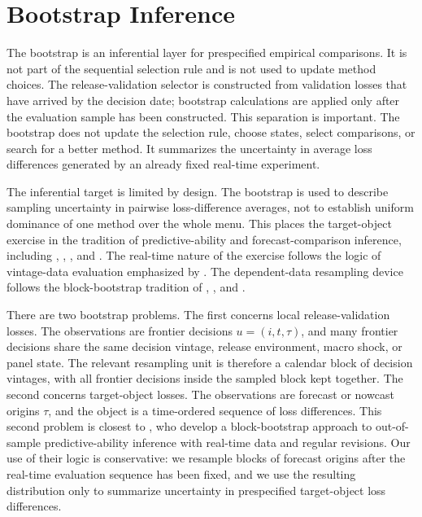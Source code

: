 \documentclass[a4paper,12pt]{article}
\newcommand{\1}{\mathbf{1}}
\begin{document}
\section{Bootstrap Inference}
\label{ia:bootstrap}

The bootstrap is an inferential layer for prespecified empirical comparisons. It is not part of the sequential selection rule and is not used to update method choices. The release-validation selector is constructed from validation losses that have arrived by the decision date; bootstrap calculations are applied only after the evaluation sample has been constructed. This separation is important. The bootstrap does not update the selection rule, choose states, select comparisons, or search for a better method. It summarizes the uncertainty in average loss differences generated by an already fixed real-time experiment.

The inferential target is limited by design. The bootstrap is used to describe sampling uncertainty in pairwise loss-difference averages, not to establish uniform dominance of one method over the whole menu. This places the target-object exercise in the tradition of predictive-ability and forecast-comparison inference, including \citet{DieboldMariano1995}, \citet{West1996}, \citet{ClarkMcCracken2001}, and \citet{GiacominiWhite2006}. The real-time nature of the exercise follows the logic of vintage-data evaluation emphasized by \citet{CroushoreStark2001}. The dependent-data resampling device follows the block-bootstrap tradition of \citet{Kunsch1989}, \citet{PolitisRomano1994}, and \citet{Lahiri2003}.

There are two bootstrap problems. The first concerns local release-validation losses. The observations are frontier decisions $u=(i,t,\tau)$, and many frontier decisions share the same decision vintage, release environment, macro shock, or panel state. The relevant resampling unit is therefore a calendar block of decision vintages, with all frontier decisions inside the sampled block kept together. The second concerns target-object losses. The observations are forecast or nowcast origins $\tau$, and the object is a time-ordered sequence of loss differences. This second problem is closest to \citet{GoncalvesMcCrackenYao2025}, who develop a block-bootstrap approach to out-of-sample predictive-ability inference with real-time data and regular revisions. Our use of their logic is conservative: we resample blocks of forecast origins after the real-time evaluation sequence has been fixed, and we use the resulting distribution only to summarize uncertainty in prespecified target-object loss differences.
\end{document}
